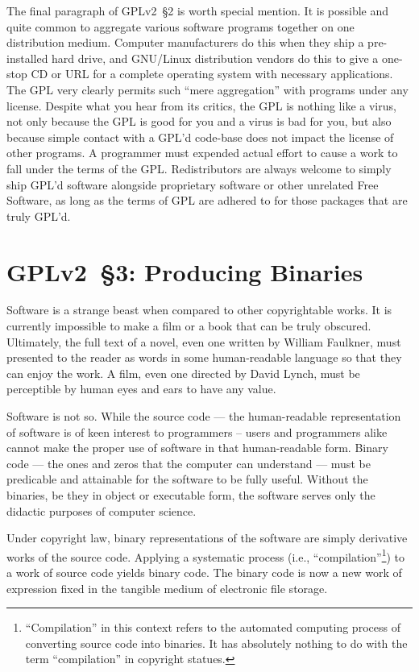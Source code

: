The final paragraph of GPLv2~\S2 is worth special mention.  It is possible and
quite common to aggregate various software programs together on one
distribution medium.  Computer manufacturers do this when they ship a
pre-installed hard drive, and GNU/Linux distribution vendors do this to
give a one-stop CD or URL for a complete operating system with necessary
applications.  The GPL very clearly permits such ``mere aggregation'' with
programs under any license.  Despite what you hear from its critics, the
GPL is nothing like a virus, not only because the GPL is good for you and
a virus is bad for you, but also because simple contact with a GPL'd
code-base does not impact the license of other programs.  A programmer must
expended actual effort  to cause a work to fall under the terms
of the GPL.  Redistributors are always welcome to simply ship GPL'd
software alongside proprietary software or other unrelated Free Software,
as long as the terms of GPL are adhered to for those packages that are
truly GPL'd.

\section{GPLv2~\S3: Producing Binaries}
\label{GPLv2s3}

Software is a strange beast when compared to other copyrightable works.
It is currently impossible to make a film or a book that can be truly
obscured.  Ultimately, the full text of a novel, even one written by
William Faulkner, must presented to the reader as words in some
human-readable language so that they can enjoy the work.  A film, even one
directed by David Lynch, must be perceptible by human eyes and ears to
have any value.

Software is not so.  While the source code --- the human-readable
representation of software is of keen interest to programmers -- users and
programmers alike cannot make the proper use of software in that
human-readable form.  Binary code --- the ones and zeros that the computer
can understand --- must be predicable and attainable for the software to
be fully useful.  Without the binaries, be they in object or executable
form, the software serves only the didactic purposes of computer science.

Under copyright law, binary representations of the software are simply
derivative works of the source code.  Applying a systematic process (i.e.,
``compilation''\footnote{``Compilation'' in this context refers to the
  automated computing process of converting source code into binaries.  It
  has absolutely nothing to do with the term ``compilation'' in copyright statues.}) to a work of source code yields binary code. The binary
code is now a new work of expression fixed in the tangible medium of
electronic file storage.

